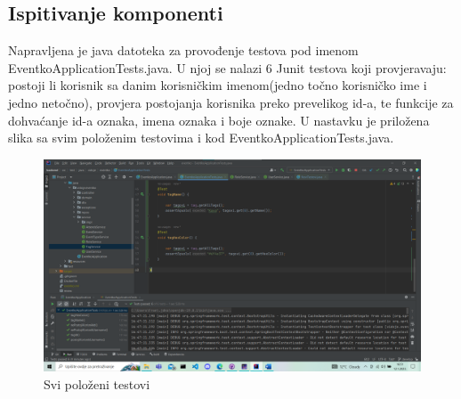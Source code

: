 	
			
			\subsection{Ispitivanje komponenti}
			
			\indent Napravljena je java datoteka za provođenje testova pod imenom EventkoApplicationTests.java. U njoj se nalazi 6 Junit testova koji provjeravaju: postoji li korisnik sa danim korisničkim imenom(jedno točno korisničko ime i jedno netočno), provjera postojanja korisnika preko prevelikog id-a, te funkcije za dohvaćanje id-a oznaka, imena oznaka i boje oznake. U nastavku je priložena slika sa svim položenim testovima i kod EventkoApplicationTests.java.
			
			
			\begin{figure}[H]
				\includegraphics[width=\textwidth]{Slike/TestoviProsli.png}
				\caption{Svi položeni testovi}
			\end{figure}
			
